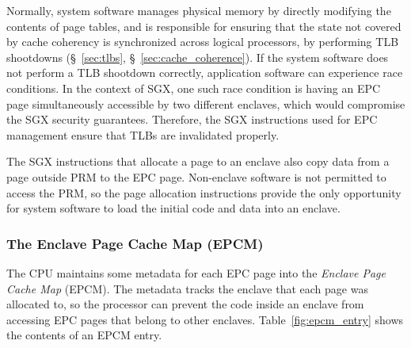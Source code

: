 Normally, system software manages physical memory by directly modifying the
contents of page tables, and is responsible for ensuring that the state not
covered by cache coherency is synchronized across logical processors, by
performing TLB shootdowns (\S~\ref{sec:tlbs}, \S~\ref{sec:cache_coherence}). If
the system software does not perform a TLB shootdown correctly, application
software can experience race conditions. In the context of SGX, one such race
condition is having an EPC page simultaneously accessible by two different
enclaves, which would compromise the SGX security guarantees. Therefore, the
SGX instructions used for EPC management ensure that TLBs are invalidated
properly.

The SGX instructions that allocate a page to an enclave also copy data from a
page outside PRM to the EPC page. Non-enclave software is not permitted to
access the PRM, so the page allocation instructions provide the only
opportunity for system software to load the initial code and data into an
enclave.

\subsubsection{The Enclave Page Cache Map (EPCM)}
\label{sec:epcm}

The CPU maintains some metadata for each EPC page into the \textit{Enclave Page
Cache Map} (EPCM). The metadata tracks the enclave that each page was allocated
to, so the processor can prevent the code inside an enclave from accessing EPC
pages that belong to other enclaves. Table~\ref{fig:epcm_entry} shows the
contents of an EPCM entry.


\begin{table}[hbt]
  \caption{
    The fields in an EPCM entry.
  }
  \label{fig:epcm_entry}
\end{table}


